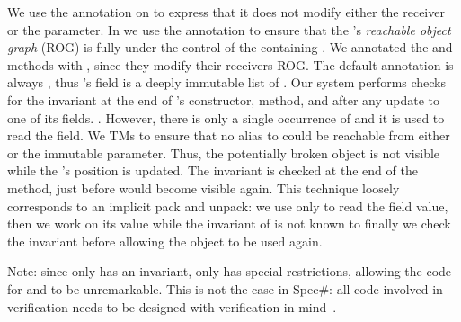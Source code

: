 We use the \Q@read@ annotation on \Q@equals@ to express that it does not modify either the
receiver or the parameter. In \Q@Cage@ we use 
the \Q@capsule@ annotation to ensure
that the \Q@Hamster@'s \emph{reachable object graph} (ROG) is fully under the control
of the containing \Q@Cage@. 
We annotated the \Q@move@
and \Q@moveTo@ methods with \Q@mut@, since they modify
their receivers ROG. The default annotation is always \Q@imm@, thus \Q@Cage@'s \Q@path@ field is a deeply immutable list of \Q@Point@s.
Our system performs  checks for the invariant
at the end of \Q@Cage@'s constructor, \Q@moveTo@ method, and after any update to one of its fields.
. However, there is only a single occurrence of \Q@this@ and it is used to read the \Q@h@ field. We  TMs to ensure that no alias to \Q@this@ could be reachable from either \Q@h@ or the immutable \Q@Point@ parameter. Thus, the potentially broken \Q@this@ object is not visible while the \Q@Hamster@'s position is updated. 
The invariant is checked at the end of the \Q@moveTo@ method, just before \Q@this@ would become visible again.
This technique loosely corresponds to an implicit pack and unpack: we use \Q@this@ only to read the field value, then we work on its value while the invariant of \Q@this@ is not known to  finally we check the invariant before allowing the object to  be used again.

Note: since only \Q@Cage@ has an invariant,
 only \Q@Cage@ has special restrictions, allowing the code for \Q@Point@ and \Q@Hamster@ to be unremarkable.
 This is not the case in Spec\#: all code involved in  verification needs to be designed with verification in mind~\cite{barnett2011specification}.

